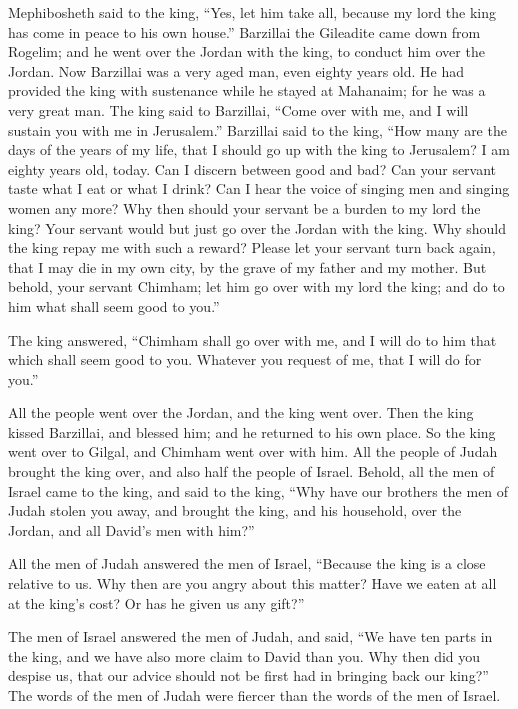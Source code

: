{\par }{\PP {}Mephibosheth said to the king, “Yes, let him take all, because my lord the king has come in peace to his own house.”
Barzillai the Gileadite came down from Rogelim; and he went over the Jordan with the king, to conduct him over the Jordan.
Now Barzillai was a very aged man, even eighty years old. He had provided the king with sustenance while he stayed at Mahanaim; for he was a very great man.
The king said to Barzillai, “Come over with me, and I will sustain you with me in Jerusalem.”
Barzillai said to the king, “How many are the days of the years of my life, that I should go up with the king to Jerusalem?
I am eighty years old, today. Can I discern between good and bad? Can your servant taste what I eat or what I drink? Can I hear the voice of singing men and singing women any more? Why then should your servant be a burden to my lord the king?
Your servant would but just go over the Jordan with the king. Why should the king repay me with such a reward?
Please let your servant turn back again, that I may die in my own city, by the grave of my father and my mother. But behold, your servant Chimham; let him go over with my lord the king; and do to him what shall seem good to you.”
\par }{\PP {}The king answered, “Chimham shall go over with me, and I will do to him that which shall seem good to you. Whatever you request of me, that I will do for you.”
\par }{\PP {}All the people went over the Jordan, and the king went over. Then the king kissed Barzillai, and blessed him; and he returned to his own place.
So the king went over to Gilgal, and Chimham went over with him. All the people of Judah brought the king over, and also half the people of Israel.
Behold, all the men of Israel came to the king, and said to the king, “Why have our brothers the men of Judah stolen you away, and brought the king, and his household, over the Jordan, and all David’s men with him?”
\par }{\PP {}All the men of Judah answered the men of Israel, “Because the king is a close relative to us. Why then are you angry about this matter? Have we eaten at all at the king’s cost? Or has he given us any gift?”
\par }{\PP {}The men of Israel answered the men of Judah, and said, “We have ten parts in the king, and we have also more claim to David than you. Why then did you despise us, that our advice should not be first had in bringing back our king?” The words of the men of Judah were fiercer than the words of the men of Israel.

}
